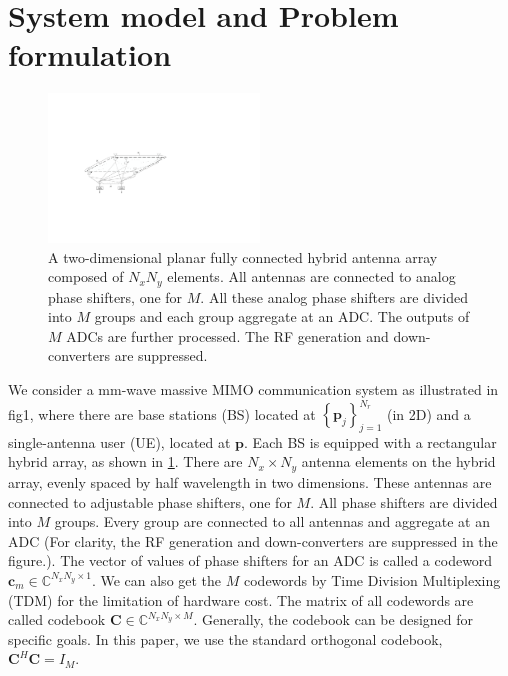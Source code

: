 \documentclass[journal]{IEEEtran}
\begin{document}
\section{System model and Problem formulation}
\label{sec:model and problem}
\begin{figure}[t]
  \centerline{\includegraphics[width=0.5\textwidth]{figures/globalHybridArray.pdf}}
  \centering
\caption{A two-dimensional planar fully connected hybrid antenna array composed of $N_xN_y$ elements. All antennas are connected to analog phase shifters, one for $M$. All these analog phase shifters are divided into $M$ groups and each group aggregate at an ADC. The outputs of $M$ ADCs are further processed. The RF generation and down-converters are suppressed. }\label{GHA}
\end{figure}
We consider a mm-wave massive MIMO communication system as illustrated in fig1, where there are base stations (BS) located at $\left\{\boldsymbol{p}_j\right\}_{j=1}^{N_r}$ (in 2D) and a single-antenna user (UE), located at $\boldsymbol{p}$. Each BS is equipped with a rectangular hybrid array, as shown in \ref{GHA}. There are $N_x\times N_y$ antenna elements on the hybrid array, evenly spaced by half wavelength in two dimensions. These antennas are connected to adjustable phase shifters, one for $M$. All phase shifters are divided into $M$ groups. Every group are connected to all antennas and aggregate at an ADC (For clarity, the RF generation and down-converters are suppressed in the figure.). The vector of values of phase shifters for an ADC is called a codeword $\boldsymbol{c}_m \in \mathbb{C}^{N_xN_y \times 1}$. We can also get the $M$ codewords by Time Division Multiplexing (TDM) for the limitation of hardware cost. The matrix of all codewords are called codebook $\boldsymbol{C}\in \mathbb{C}^{N_xN_y \times M}$. Generally, the codebook can be designed for specific goals. In this paper, we use the standard orthogonal codebook, $\boldsymbol{C}^H\boldsymbol{C}=I_M$.
\end{document}
